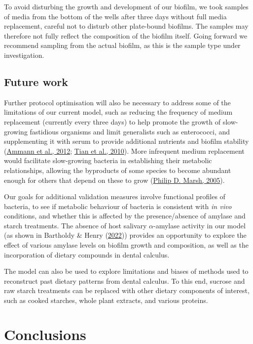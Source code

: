 \documentclass[
  letterpaper,
]{book}
\begin{document}
To avoid disturbing the growth and development of our biofilm, we took
samples of media from the bottom of the wells after three days without
full media replacement, careful not to disturb other plate-bound
biofilms. The samples may therefore not fully reflect the composition of
the biofilm itself. Going forward we recommend sampling from the actual
biofilm, as this is the sample type under investigation.

\hypertarget{future-work}{%
\subsection{Future work}\label{future-work}}

Further protocol optimisation will also be necessary to address some of
the limitations of our current model, such as reducing the frequency of
medium replacement (currently every three days) to help promote the
growth of slow-growing fastidious organisms and limit generalists such
as enterococci, and supplementing it with serum to provide additional
nutrients and biofilm stability
(\protect\hyperlink{ref-ammannZurichBiofilm2012}{Ammann et al., 2012};
\protect\hyperlink{ref-tianUsingDGGE2010}{Tian et al., 2010}). More
infrequent medium replacement would facilitate slow-growing bacteria in
establishing their metabolic relationships, allowing the byproducts of
some species to become abundant enough for others that depend on these
to grow (\protect\hyperlink{ref-marshDentalPlaque2005}{Philip D. Marsh,
2005}).

Our goals for additional validation measures involve functional profiles
of bacteria, to see if metabolic behaviour of bacteria is consistent
with \emph{in vivo} conditions, and whether this is affected by the
presence/absence of amylase and starch treatments. The absence of host
salivary \(\alpha\)-amylase activity in our model (as shown in Bartholdy
\& Henry
(\protect\hyperlink{ref-bartholdyInvestigatingBiases2022}{2022}))
provides an opportunity to explore the effect of various amylase levels
on biofilm growth and composition, as well as the incorporation of
dietary compounds in dental calculus.

The model can also be used to explore limitations and biases of methods
used to reconstruct past dietary patterns from dental calculus. To this
end, sucrose and raw starch treatments can be replaced with other
dietary components of interest, such as cooked starches, whole plant
extracts, and various proteins.

\hypertarget{conclusions}{%
\section{Conclusions}\label{conclusions}}
\end{document}
